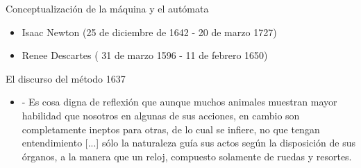 \begin{frame}[fragile]{Conceptualización de la máquina y el autómata}

\begin{itemize}
	\item Isaac Newton \quad  (25 de diciembre de 1642 - 20 de marzo 1727)
	\item Renee Descartes \quad  ( 31 de marzo 1596 - 11 de febrero 1650)
\end{itemize}

\vspace{10px}
\pause
{}
\begin{block}{El discurso del método 1637 }
	\begin{itemize}
		\pause
		\item - Es cosa digna de reflexión que aunque muchos animales muestran mayor habilidad que nosotros en algunas de sus acciones, en cambio son completamente ineptos para otras, de lo cual se infiere, no que tengan entendimiento [...] sólo la naturaleza guía sus actos según la disposición de sus órganos, a la manera que un reloj, compuesto solamente de ruedas y resortes.
		
		
	\end{itemize}
\end{block}

\end{frame}


